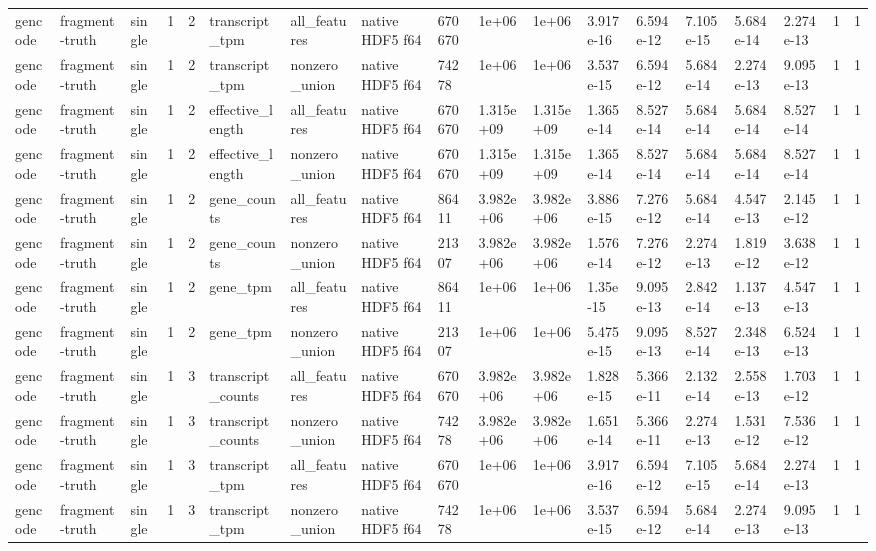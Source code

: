 \begin{tabular}{llllllllllllllllll}
gencode & fragment-truth & single & 1 & 2 & transcript\_tpm & all\_features & native HDF5 f64 & 670670 & 1e+06 & 1e+06 & 3.917e-16 & 6.594e-12 & 7.105e-15 & 5.684e-14 & 2.274e-13 & 1 & 1 \\
gencode & fragment-truth & single & 1 & 2 & transcript\_tpm & nonzero\_union & native HDF5 f64 & 74278 & 1e+06 & 1e+06 & 3.537e-15 & 6.594e-12 & 5.684e-14 & 2.274e-13 & 9.095e-13 & 1 & 1 \\
gencode & fragment-truth & single & 1 & 2 & effective\_length & all\_features & native HDF5 f64 & 670670 & 1.315e+09 & 1.315e+09 & 1.365e-14 & 8.527e-14 & 5.684e-14 & 5.684e-14 & 8.527e-14 & 1 & 1 \\
gencode & fragment-truth & single & 1 & 2 & effective\_length & nonzero\_union & native HDF5 f64 & 670670 & 1.315e+09 & 1.315e+09 & 1.365e-14 & 8.527e-14 & 5.684e-14 & 5.684e-14 & 8.527e-14 & 1 & 1 \\
gencode & fragment-truth & single & 1 & 2 & gene\_counts & all\_features & native HDF5 f64 & 86411 & 3.982e+06 & 3.982e+06 & 3.886e-15 & 7.276e-12 & 5.684e-14 & 4.547e-13 & 2.145e-12 & 1 & 1 \\
gencode & fragment-truth & single & 1 & 2 & gene\_counts & nonzero\_union & native HDF5 f64 & 21307 & 3.982e+06 & 3.982e+06 & 1.576e-14 & 7.276e-12 & 2.274e-13 & 1.819e-12 & 3.638e-12 & 1 & 1 \\
gencode & fragment-truth & single & 1 & 2 & gene\_tpm & all\_features & native HDF5 f64 & 86411 & 1e+06 & 1e+06 & 1.35e-15 & 9.095e-13 & 2.842e-14 & 1.137e-13 & 4.547e-13 & 1 & 1 \\
gencode & fragment-truth & single & 1 & 2 & gene\_tpm & nonzero\_union & native HDF5 f64 & 21307 & 1e+06 & 1e+06 & 5.475e-15 & 9.095e-13 & 8.527e-14 & 2.348e-13 & 6.524e-13 & 1 & 1 \\
gencode & fragment-truth & single & 1 & 3 & transcript\_counts & all\_features & native HDF5 f64 & 670670 & 3.982e+06 & 3.982e+06 & 1.828e-15 & 5.366e-11 & 2.132e-14 & 2.558e-13 & 1.703e-12 & 1 & 1 \\
gencode & fragment-truth & single & 1 & 3 & transcript\_counts & nonzero\_union & native HDF5 f64 & 74278 & 3.982e+06 & 3.982e+06 & 1.651e-14 & 5.366e-11 & 2.274e-13 & 1.531e-12 & 7.536e-12 & 1 & 1 \\
gencode & fragment-truth & single & 1 & 3 & transcript\_tpm & all\_features & native HDF5 f64 & 670670 & 1e+06 & 1e+06 & 3.917e-16 & 6.594e-12 & 7.105e-15 & 5.684e-14 & 2.274e-13 & 1 & 1 \\
gencode & fragment-truth & single & 1 & 3 & transcript\_tpm & nonzero\_union & native HDF5 f64 & 74278 & 1e+06 & 1e+06 & 3.537e-15 & 6.594e-12 & 5.684e-14 & 2.274e-13 & 9.095e-13 & 1 & 1 \\

\end{tabular}
